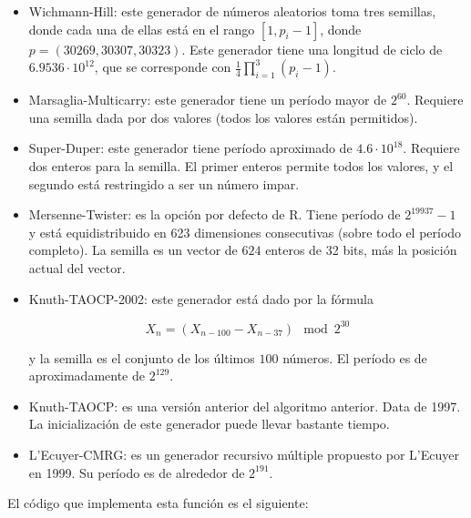 \documentclass[12pt,a4paper,twoside,openright,titlepage,final]{article}
\begin{document}
\begin{itemize}
\item Wichmann-Hill: este generador de números aleatorios toma tres semillas, donde cada una de ellas está en el rango $[1, p_i-1]$, donde $p = (30269, 30307, 30323)$. Este generador tiene una longitud de ciclo de $6.9536\cdot10^{12}$, que se corresponde con $\frac{1}{4} \prod_{i=1}^{3}(p_i - 1)$.
\item Marsaglia-Multicarry: este generador tiene un período mayor de $2^{60}$. Requiere una semilla dada por dos valores (todos los valores están permitidos).
\item Super-Duper: este generador tiene período aproximado de $4.6\cdot 10^{18}$. Requiere dos enteros para la semilla. El primer enteros permite todos los valores, y el segundo está restringido a ser un número impar.
\item Mersenne-Twister: es la opción por defecto de R. Tiene período de $2^{19937}-1$ y está equidistribuido en 623 dimensiones consecutivas (sobre todo el período completo). La semilla es un vector de $624$ enteros de 32 bits, más la posición actual del vector.
\item Knuth-TAOCP-2002: este generador está dado por la fórmula 

\[ X_n = (X_{n-100} - X_{n-37}) \mod 2^{30} \]

y la semilla es el conjunto de los últimos $100$ números. El período es de aproximadamente de $2^{129}$.
\item Knuth-TAOCP: es una versión anterior del algoritmo anterior. Data de 1997. La inicialización de este generador puede llevar bastante tiempo.
\item L'Ecuyer-CMRG: es un generador recursivo múltiple propuesto por L'Ecuyer en 1999. Su período es de alrededor de $2^{191}$.
\end{itemize}

El código que implementa esta función es el siguiente:
\end{document}
